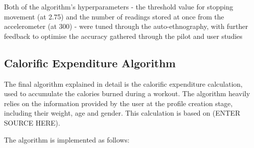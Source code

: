 \documentclass{l4proj}
\begin{document}
Both of the algorithm’s hyperparameters - the threshold value for stopping movement (at 2.75) and the number of readings stored at once from the accelerometer (at 300) - were tuned through the auto-ethnography, with further feedback to optimise the accuracy gathered through the pilot and user studies

\subsection{Calorific Expenditure Algorithm}

The final algorithm explained in detail is the calorific expenditure calculation, used to accumulate the calories burned during a workout. The algorithm heavily relies on the information provided by the user at the profile creation stage, including their weight, age and gender. This calculation is based on (ENTER SOURCE HERE).

The algorithm is implemented as follows:
\end{document}
